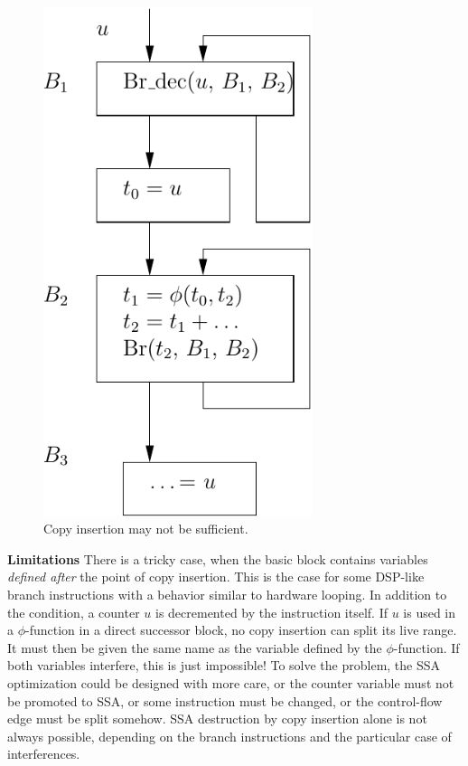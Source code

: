 \begin{figure}[t]
{\begin{minipage}{0.33\textwidth}
    \includegraphics[width=0.7\textwidth]{cexple-impossible-3}
  \end{minipage}
}
\caption{Copy insertion may not be sufficient.\label{fig:alternative_ssa_destruction:ex_jump_impossible}}
\end{figure}

{\bf Limitations}
There is a  tricky case, when the basic block contains variables
\emph{defined after} the point of copy insertion. This is the case for some
DSP-like branch instructions with a behavior similar to hardware looping. In
addition to the condition, a counter $u$ is decremented by the instruction
itself. If $u$ is used in a $\phi$-function in a direct successor block, no
copy insertion can split its live range. It must then be given the same name as
the variable defined by the $\phi$-function. If both variables interfere, this
is just impossible! To solve the problem, the SSA optimization could be
designed with more care, or the counter variable must not be promoted to SSA,
or some instruction must be changed, or the control-flow edge must be split
somehow.  SSA destruction by
copy insertion alone is not always possible, depending on the branch
instructions and the particular case of interferences.


